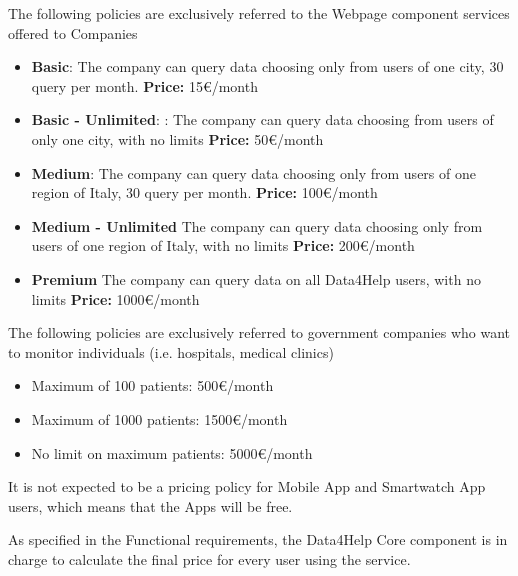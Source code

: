 The following policies are exclusively referred to the Webpage component services offered to Companies

\begin{itemize}
    \item \textbf{Basic}: The company can query data choosing only from users of one city, 30 query per month.
     \textbf{Price:} 15\euro/month
    \item	\textbf{Basic - Unlimited}: : The company can query data choosing from users of only one city, with no limits
\textbf{Price:} 50\euro/month
    \item \textbf{Medium}: The company can query data choosing only from users of one region of Italy, 30 query per month.
\textbf{Price:} 100\euro/month
    \item \textbf{Medium - Unlimited} The company can query data choosing only from users of one region of Italy, with no limits
\textbf{Price:} 200\euro/month
    \item \textbf{Premium} The company can query data on all Data4Help users, with no limits
\textbf{Price:} 1000\euro/month
\end{itemize}

\noindent The following policies are exclusively referred to government companies who want to monitor individuals (i.e. hospitals, medical clinics) 

\begin{itemize}
    \item Maximum of 100 patients:
500\euro/month
    \item Maximum of 1000 patients: 
1500\euro/month
    \item No limit on maximum patients:
5000\euro/month
\end{itemize}




\noindent It is not expected to be a pricing policy for Mobile App and Smartwatch App users, which means that the Apps will be free.

\noindent As specified in the Functional requirements, the Data4Help Core component is in charge to calculate the final price for every user using the service.







